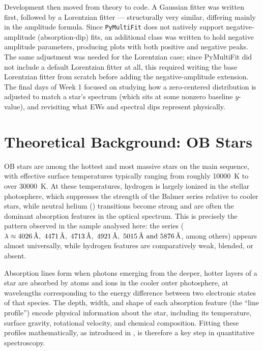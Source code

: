 \documentclass[12pt]{article}
\begin{document}
Development then moved from theory to code. A Gaussian fitter was written first, followed by a Lorentzian fitter --- structurally very similar, differing mainly in the amplitude formula. Since \texttt{PyMultiFit} does not natively support negative-amplitude (absorption-dip) fits, an additional class was written to hold negative amplitude parameters, producing plots with both positive and negative peaks. The same adjustment was needed for the Lorentzian case; since PyMultiFit did not include a default Lorentzian fitter at all, this required writing the base Lorentzian fitter from scratch before adding the negative-amplitude extension. The final days of Week 1 focused on studying how a zero-centered distribution is adjusted to match a star's spectrum (which sits at some nonzero baseline $y$-value), and revisiting what EWs and spectral dips represent physically.


\section{Theoretical Background: OB Stars}
\label{sec:theory}

OB stars are among the hottest and most massive stars on the main sequence, with effective surface temperatures typically ranging from roughly \SI{10000}{\kelvin} to over \SI{30000}{\kelvin}. At these temperatures, hydrogen is largely ionized in the stellar photosphere, which suppresses the strength of the Balmer series relative to cooler stars, while neutral helium () transitions become strong and are often the dominant absorption features in the optical spectrum. This is precisely the pattern observed in the sample analysed here: the  series ($\lambda \approx \SIlist{4026;4471;4713;4921;5015;5876}{\angstrom}$, among others) appears almost universally, while hydrogen features are comparatively weak, blended, or absent.

Absorption lines form when photons emerging from the deeper, hotter layers of a star are absorbed by atoms and ions in the cooler outer photosphere, at wavelengths corresponding to the energy difference between two electronic states of that species. The depth, width, and shape of each absorption feature (the ``line profile'') encode physical information about the star, including its temperature, surface gravity, rotational velocity, and chemical composition. Fitting these profiles mathematically, as introduced in , is therefore a key step in quantitative spectroscopy.
\end{document}
